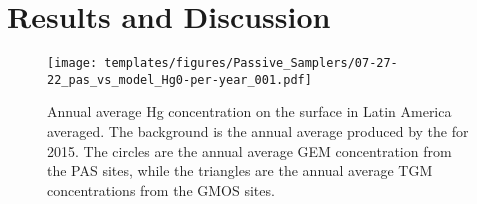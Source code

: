\section{Results and Discussion}

\begin{figure}[H]
\centering
  \texttt{[image: templates/figures/Passive\_Samplers/07-27-22\_pas\_vs\_model\_Hg0-per-year\_001.pdf]}
  \caption{Annual average Hg concentration on the surface in Latin America averaged. The background is the annual average \hgc produced by the \on for 2015. The circles are the annual average GEM concentration from the PAS sites, while the triangles are the annual average TGM concentrations from the GMOS sites.\cite{quant_measuring_2021,sprovieri_atmospheric_2016,koenig_seasonal_2021}}
  \label{fig:06-12-22_pas_vs_model_Hg0-per-year_001}
  
  
\end{figure}
\FloatBarrier

